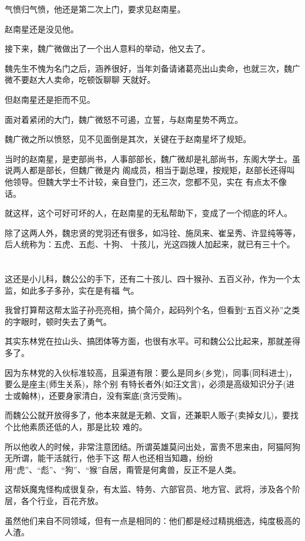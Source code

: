 \documentclass[11pt,a4paper,onecolumn]{article}
\begin{document}
气愤归气愤，他还是第二次上门，要求见赵南星。

赵南星还是没见他。

接下来，魏广微做出了一个出人意料的举动，他又去了。

魏先生不愧为名门之后，涵养很好，当年刘备请诸葛亮出山卖命，也就三次，魏广微不要赵大人卖命，吃顿饭聊聊
天就好。

但赵南星还是拒而不见。

面对着紧闭的大门，魏广微怒不可遏，立誓，与赵南星势不两立。

魏广微之所以愤怒，见不见面倒是其次，关键在于赵南星坏了规矩。

当时的赵南星，是吏部尚书，人事部部长，魏广微却是礼部尚书，东阁大学士。虽说两人都是部长，但魏广微是内
阁成员，相当于副总理，按规矩，赵部长还得叫他领导。但魏大学士不计较，亲自登门，还三次，您都不见，实在
有点太不像话。

就这样，这个可好可坏的人，在赵南星的无私帮助下，变成了一个彻底的坏人。

除了这两人外，魏忠贤的党羽还有很多，如冯铨、施凤来、崔呈秀、许显纯等等，后人统称为：五虎、五彪、十狗、
十孩儿，光这四拨人加起来，就已有三十个。

\section[\thesection]{}

这还是小儿科，魏公公的手下，还有二十孩儿、四十猴孙、五百义孙，作为一个太监，如此多子多孙，实在是有福
气。

我曾打算帮这帮太监子孙亮亮相，搞个简介，起码列个名，但看到``五百义孙''之类的字眼时，顿时失去了勇气。

其实东林党在拉山头、搞团体等方面，也很有水平。可和魏公公比起来，那就差得多了。

因为东林党的入伙标准较高，且渠道有限：要么是同乡(乡党)，同事(同科进士)，要么是座主(师生关系)，除个别
有特长者外(如汪文言)，必须是高级知识分子(进士或翰林)，还要身家清白，没有案底(贪污受贿)。

而魏公公就开放得多了，他本来就是无赖、文盲，还兼职人贩子(卖掉女儿)，要找个比他素质还低的人，那是比较
难的。

所以他收人的时候，非常注意团结。所谓英雄莫问出处，富贵不思来由，阿猫阿狗无所谓，能干活就行，他手下这
帮人也还相当知趣，纷纷用``虎''、``彪''、``狗''、``猴''自居，甭管是何禽兽，反正不是人类。

这帮妖魔鬼怪构成很复杂，有太监、特务、六部官员、地方官、武将，涉及各个阶层，各个行业，百花齐放。

虽然他们来自不同领域，但有一点是相同的：他们都是经过精挑细选，纯度极高的人渣。
\end{document}
